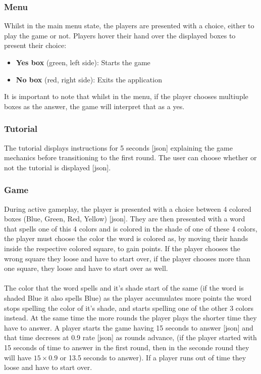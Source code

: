 \documentclass[12pt]{article}
\begin{document}
\subsubsection{Menu}

Whilst in the main menu state, the players are presented with a choice, either
to play the game or not. Players hover their hand over the displayed boxes to
present their choice:

\begin{itemize}
    \item \textbf{Yes box} (green, left side): Starts the game
    \item \textbf{No box} (red, right side): Exits the application
\end{itemize}

It is important to note that whilst in the menu, if the player chooses
multiuple boxes as the answer, the game will interpret that as a yes.

\subsubsection{Tutorial}

The tutorial displays instructions for 5 seconds [json] explaining the game
mechanics before transitioning to the first round. The user can choose whether
or not the tutorial is displayed [json].

\subsubsection{Game}

During active gameplay, the player is presented with a choice between 4 colored
boxes (Blue, Green, Red, Yellow) [json]. They are then presented with a word
that spells one of this 4 colors and is colored in the shade of one of these 4
colors, the player must choose the color the word is colored as, by moving
their hands inside the respective colored square, to gain points. If the player
chooses the wrong square they loose and have to start over, if the player
chooses more than one square, they loose and have to start over as well.

\paragraph{}
The color that the word spells and it's shade start of the same (if the word is
shaded Blue it also spells Blue) as the player accumulates more points the word
stops spelling the color of it's shade, and starts spelling one of the other 3
colors instead. At the same time the more rounds the player plays the shorter
time they have to answer. A player starts the game having 15 seconds to answer
    [json] and that time decreses at 0.9 rate [json] as rounds advance, (if the
player started with 15 seconds of time to answer in the first round, then in
the seconde round they will have $15 \times 0.9$ or 13.5 seconds to answer). If
a player runs out of time they loose and have to start over.
\end{document}
